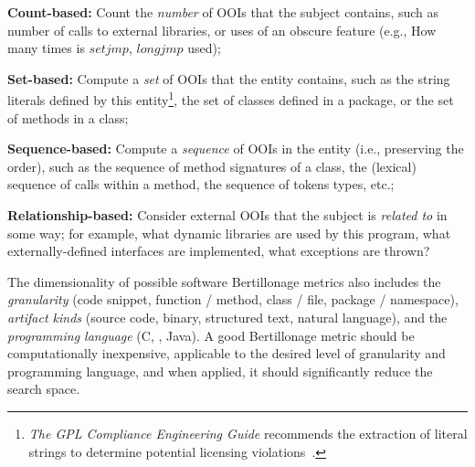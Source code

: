 \begin{description}

\item{\bf Count-based:} Count the \emph{number} of OOIs that the subject
    contains, such as number of calls to external libraries, or uses of an
    obscure feature (e.g., How many times is $setjmp$, $longjmp$ used);

\item{\bf Set-based:} Compute a \emph{set} of OOIs that the entity contains,
    such as the string literals defined by this entity\footnote{\emph{The
    GPL Compliance Engineering Guide} recommends the extraction of literal
    strings to determine potential licensing
    violations~\cite{GPLcomplianceGuide}.}, the set of classes defined in a
    package, or the set of methods in a class;

\item{\bf Sequence-based:} Compute a \emph{sequence} of OOIs in the entity
    (i.e., preserving the order), such as the sequence of method
    signatures of a class, the (lexical) sequence of calls within a method,
    the sequence of tokens types, etc.;

\item{\bf Relationship-based:} Consider external OOIs that the subject is
    \emph{related to} in some way; for example, what dynamic libraries are
    used by this program, what externally-defined interfaces are
    implemented, what exceptions are thrown?


\end{description}

The dimensionality of possible software Bertillonage metrics also includes
the \emph{granularity} (code snippet, function / method, class / file,
package / namespace), \emph{artifact kinds} (source code, binary,
structured text, natural language), and the \emph{programming language} (C,
\Cpp, Java).  A good Bertillonage  metric should be computationally
inexpensive, applicable to the desired level of granularity and programming
language, and when applied, it should significantly reduce the search
space.



